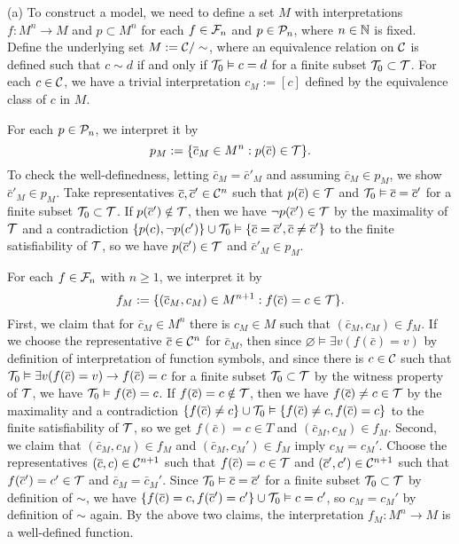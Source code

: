 \documentclass{../../large}
\begin{document}
\begin{pf}
(a)
To construct a model, we need to define a set $M$ with interpretations $f:M^n\to M$ and $p\subset M^n$ for each $f\in\mathcal{F}_n$ and $p\in\mathcal{P}_n$, where $n\in\mathbb{N}$ is fixed.
Define the underlying set $M:=\mathcal{C}/\sim$, where an equivalence relation on $\mathcal{C}$ is defined such that $c\sim d$ if and only if $\mathcal{T}_0\vDash c=d$ for a finite subset $\mathcal{T}_0\subset\mathcal{T}$.
For each $c\in\mathcal{C}$, we have a trivial interpretation $c_M:=[c]$ defined by the equivalence class of $c$ in $M$.

For each $p\in\mathcal{P}_n$, we interpret it by
\[p_M:=\{\overline c_M\in M^n:p(\overline c)\in\mathcal{T}\}.\]
To check the well-definedness, letting $\bar c_M=\bar c'_M$ and assuming $\bar c_M\in p_M$, we show $\bar c'_M\in p_M$.
Take representatives $\overline c,\overline c'\in\mathcal{C}^n$ such that $p(\overline c)\in\mathcal{T}$ and $\mathcal{T}_0\vDash\overline c=\overline c'$ for a finite subset $\mathcal{T}_0\subset\mathcal{T}$.
If $p(\overline c')\notin\mathcal{T}$, then we have $\neg p(\overline c')\in\mathcal{T}$ by the maximality of $\mathcal{T}$ and a contradiction $\{p(c),\neg p(c')\}\cup\mathcal{T}_0\vDash\{\overline c=\overline c',\overline c\ne\overline c'\}$ to the finite satisfiability of $\mathcal{T}$, so we have $p(\overline c')\in\mathcal{T}$ and $\bar c'_M\in p_M$.

For each $f\in\mathcal{F}_n$ with $n\ge1$, we interpret it by
\[f_M:=\{(\overline c_M,c_M)\in M^{n+1}:f(\overline c)=c\in\mathcal{T}\}.\]
First, we claim that for $\bar c_M\in M^n$ there is $c_M\in M$ such that $(\bar c_M,c_M)\in f_M$.
If we choose the representative $\overline c\in\mathcal{C}^n$ for $\bar c_M$, then since $\varnothing\vDash\exists v(f(\bar c)=v)$ by definition of interpretation of function symbols, and since there is $c\in\mathcal{C}$ such that $\mathcal{T}_0\vDash\exists v(f(\overline c)=v)\to f(\overline c)=c$ for a finite subset $\mathcal{T}_0\subset\mathcal{T}$ by the witness property of $\mathcal{T}$, we have $\mathcal{T}_0\vDash f(\overline c)=c$.
If $f(\overline c)=c\notin\mathcal{T}$, then we have $f(\overline c)\ne c\in\mathcal{T}$ by the maximality and a contradiction $\{f(\overline c)\ne c\}\cup\mathcal{T}_0\vDash\{f(\overline c)\ne c,f(\overline c)=c\}$ to the finite satisfiability of $\mathcal{T}$, so we get $f(\bar c)=c\in T$ and $(\bar c_M,c_M)\in f_M$.
Second, we claim that $(\bar c_M,c_M)\in f_M$ and $(\bar c_M,c_M')\in f_M$ imply $c_M=c_M'$.
Choose the representatives $(\overline c,c)\in\mathcal{C}^{n+1}$ such that $f(\overline c)=c\in\mathcal{T}$ and $(\overline c',c')\in\mathcal{C}^{n+1}$ such that $f(\overline c')=c'\in\mathcal{T}$ and $\bar c_M=\bar c_M'$.
Since $\mathcal{T}_0\vDash\overline c=\overline c'$ for a finite subset $\mathcal{T}_0\subset\mathcal{T}$ by definition of $\sim$, we have $\{f(\overline c)=c,f(\overline c')=c'\}\cup\mathcal{T}_0\vDash c=c'$, so $c_M=c_M'$ by definition of $\sim$ again.
By the above two claims, the interpretation $f_M:M^n\to M$ is a well-defined function.


\end{pf}
\end{document}
